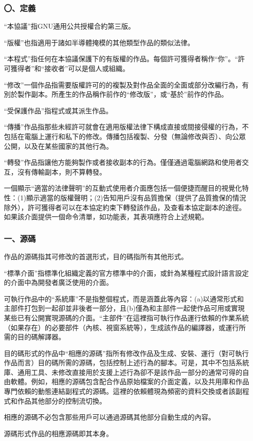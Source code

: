 \subsubsection{〇、定義}
“本協議”指GNU通用公共授權合約第三版。\par
“版權”也指適用于諸如半導體掩模的其他類型作品的類似法律。\par
“本程式”指任何在本協議保護下的有版權的作品。每個許可獲得者稱作“你”。“許可獲得者”和“接收者”可以是個人或組織。\par
“修改”一個作品指需要版權許可的的複製及對作品全面的全面或部分改編行為，有別於製作副本。所產生的作品稱作前作的“修改版”，或“基於”前作的作品。\par
“受保護作品”指程式或其派生作品。\par
“傳播”作品指那些未經許可就會在適用版權法律下構成直接或間接侵權的行為，不包括在電腦上運行和私下的修改。傳播包括複製、分發（無論修改與否）、向公眾公開，以及在某些國家的其他行為。\par
“轉發”作品指讓他方能夠製作或者接收副本的行為。僅僅通過電腦網路和使用者交互，沒有傳輸副本，則不算轉發。\par
一個顯示“適當的法律聲明”的互動式使用者介面應包括一個便捷而醒目的視覺化特性：(1)顯示適當的版權聲明；(2)告知用戶沒有品質擔保（提供了品質擔保的情況除外），許可獲得者可以在本協定約束下轉發該作品，及查看本協定副本的途徑。如果該介面提供一個命令清單，如功能表，其表項應符合上述規範。
\subsubsection{一、源碼}
作品的源碼指其可修改的首選形式，目的碼指所有其他形式。\par
“標準介面”指標準化組織定義的官方標準中的介面，或針為某種程式設計語言設定的介面中為開發者廣泛使用的介面。\par
可執行作品中的“系統庫”不是指整個程式，而是涵蓋此等內容：(a)以通常形式和主部件打包到一起卻並非後者一部分，且(b)僅為和主部件一起使作品可用或實現某些已有公開實現源碼的介面。“主部件”在這裡指可執行作品運行依賴的作業系統（如果存在）的必要部件（內核、視窗系統等），生成該作品的編譯器，或運行所需的目的碼解譯器。\par
目的碼形式的作品中“相應的源碼”指所有修改作品及生成、安裝、運行（對可執行作品而言）目的碼所需的源碼，包括控制上述行為的腳本。可是，其中不包括系統庫、通用工具、未修改直接用於支援上述行為卻不是該作品一部分的通常可得的自由軟體。例如，相應的源碼包含配合作品原始檔案的介面定義，以及共用庫和作品專門依賴的動態連結副程式的源碼。這裡的依賴體現為頻密的資料交換或者該副程式和作品其他部分的控制流切換。\par
相應的源碼不必包含那些用戶可以通過源碼其他部分自動生成的內容。\par
源碼形式作品的相應源碼即其本身。
